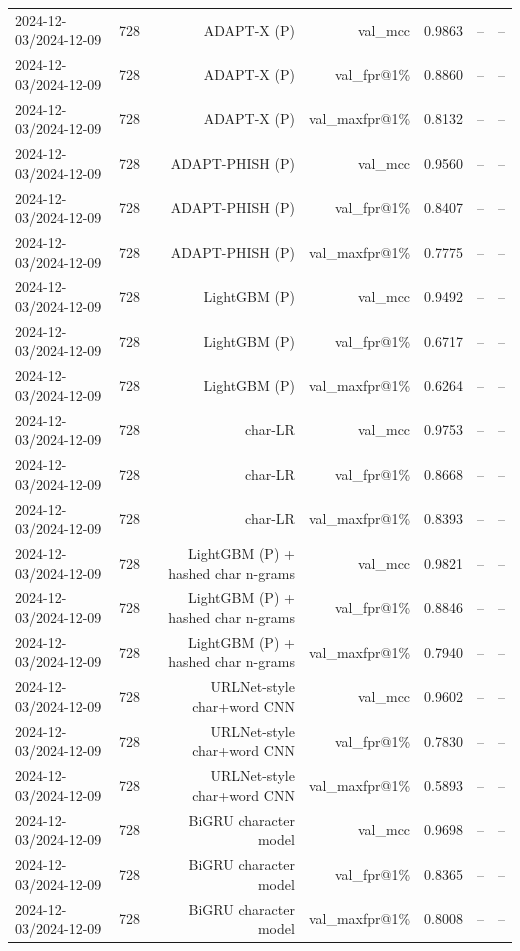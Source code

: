 \begin{table}[t]
\begin{tabular}{llrrrrr}
2024-12-03/2024-12-09 & 728 & ADAPT-X (P) & val\_mcc & 0.9863 & -- & -- \\
2024-12-03/2024-12-09 & 728 & ADAPT-X (P) & val\_fpr@1\% & 0.8860 & -- & -- \\
2024-12-03/2024-12-09 & 728 & ADAPT-X (P) & val\_maxfpr@1\% & 0.8132 & -- & -- \\
2024-12-03/2024-12-09 & 728 & ADAPT-PHISH (P) & val\_mcc & 0.9560 & -- & -- \\
2024-12-03/2024-12-09 & 728 & ADAPT-PHISH (P) & val\_fpr@1\% & 0.8407 & -- & -- \\
2024-12-03/2024-12-09 & 728 & ADAPT-PHISH (P) & val\_maxfpr@1\% & 0.7775 & -- & -- \\
2024-12-03/2024-12-09 & 728 & LightGBM (P) & val\_mcc & 0.9492 & -- & -- \\
2024-12-03/2024-12-09 & 728 & LightGBM (P) & val\_fpr@1\% & 0.6717 & -- & -- \\
2024-12-03/2024-12-09 & 728 & LightGBM (P) & val\_maxfpr@1\% & 0.6264 & -- & -- \\
2024-12-03/2024-12-09 & 728 & char-LR & val\_mcc & 0.9753 & -- & -- \\
2024-12-03/2024-12-09 & 728 & char-LR & val\_fpr@1\% & 0.8668 & -- & -- \\
2024-12-03/2024-12-09 & 728 & char-LR & val\_maxfpr@1\% & 0.8393 & -- & -- \\
2024-12-03/2024-12-09 & 728 & LightGBM (P) + hashed char n-grams & val\_mcc & 0.9821 & -- & -- \\
2024-12-03/2024-12-09 & 728 & LightGBM (P) + hashed char n-grams & val\_fpr@1\% & 0.8846 & -- & -- \\
2024-12-03/2024-12-09 & 728 & LightGBM (P) + hashed char n-grams & val\_maxfpr@1\% & 0.7940 & -- & -- \\
2024-12-03/2024-12-09 & 728 & URLNet-style char+word CNN & val\_mcc & 0.9602 & -- & -- \\
2024-12-03/2024-12-09 & 728 & URLNet-style char+word CNN & val\_fpr@1\% & 0.7830 & -- & -- \\
2024-12-03/2024-12-09 & 728 & URLNet-style char+word CNN & val\_maxfpr@1\% & 0.5893 & -- & -- \\
2024-12-03/2024-12-09 & 728 & BiGRU character model & val\_mcc & 0.9698 & -- & -- \\
2024-12-03/2024-12-09 & 728 & BiGRU character model & val\_fpr@1\% & 0.8365 & -- & -- \\
2024-12-03/2024-12-09 & 728 & BiGRU character model & val\_maxfpr@1\% & 0.8008 & -- & -- \\

\end{tabular}
\end{table}
